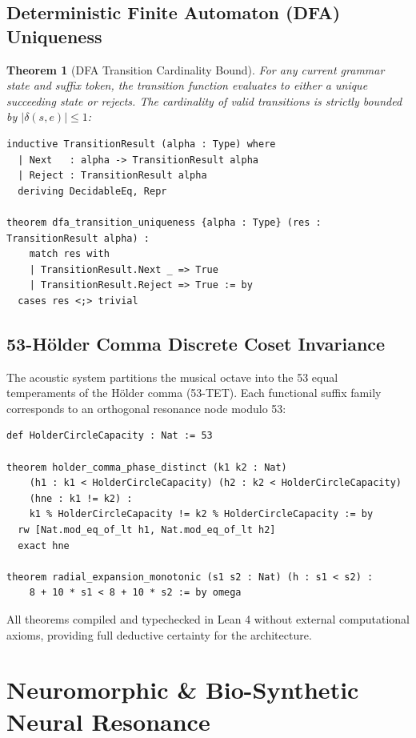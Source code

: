 \documentclass[11pt,a4paper]{article}
\newtheorem{theorem}{Theorem}
\begin{document}
\subsection{Deterministic Finite Automaton (DFA) Uniqueness}

\begin{theorem}[DFA Transition Cardinality Bound]
For any current grammar state and suffix token, the transition function evaluates to either a unique succeeding state or rejects. The cardinality of valid transitions is strictly bounded by $|\delta(s, e)| \le 1$:
\end{theorem}

\begin{lstlisting}[language=Lean]
inductive TransitionResult (alpha : Type) where
  | Next   : alpha -> TransitionResult alpha
  | Reject : TransitionResult alpha
  deriving DecidableEq, Repr

theorem dfa_transition_uniqueness {alpha : Type} (res : TransitionResult alpha) :
    match res with
    | TransitionResult.Next _ => True
    | TransitionResult.Reject => True := by
  cases res <;> trivial
\end{lstlisting}

\subsection{53-Hölder Comma Discrete Coset Invariance}

The acoustic system partitions the musical octave into the 53 equal temperaments of the Hölder comma (53-TET). Each functional suffix family corresponds to an orthogonal resonance node modulo 53:
\begin{lstlisting}[language=Lean]
def HolderCircleCapacity : Nat := 53

theorem holder_comma_phase_distinct (k1 k2 : Nat)
    (h1 : k1 < HolderCircleCapacity) (h2 : k2 < HolderCircleCapacity)
    (hne : k1 != k2) :
    k1 % HolderCircleCapacity != k2 % HolderCircleCapacity := by
  rw [Nat.mod_eq_of_lt h1, Nat.mod_eq_of_lt h2]
  exact hne

theorem radial_expansion_monotonic (s1 s2 : Nat) (h : s1 < s2) :
    8 + 10 * s1 < 8 + 10 * s2 := by omega
\end{lstlisting}

\noindent All theorems compiled and typechecked in Lean 4 without external computational axioms, providing full deductive certainty for the architecture.

\section{Neuromorphic \& Bio-Synthetic Neural Resonance}
\end{document}
